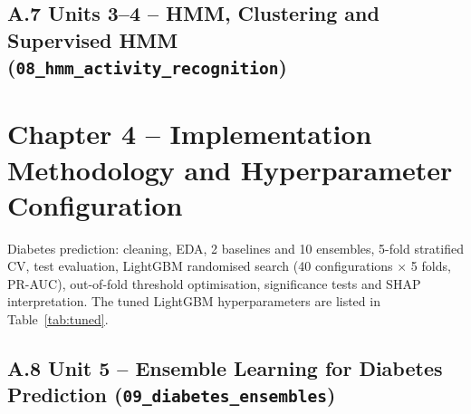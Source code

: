 \subsection*{A.7 Units 3–4 – HMM, Clustering and Supervised HMM (\texttt{08\_hmm\_activity\_recognition})}


\section*{Chapter 4 – Implementation Methodology and Hyperparameter Configuration}
Diabetes prediction: cleaning, EDA, 2 baselines and 10 ensembles, 5-fold stratified CV, test evaluation, LightGBM
randomised search (40 configurations $\times$ 5 folds, PR-AUC), out-of-fold threshold optimisation, significance tests
and SHAP interpretation. The tuned LightGBM hyperparameters are listed in Table~\ref{tab:tuned}.
\subsection*{A.8 Unit 5 – Ensemble Learning for Diabetes Prediction (\texttt{09\_diabetes\_ensembles})}

